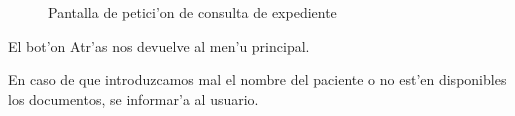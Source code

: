 \begin{enumerate}
\begin{itemize}
\begin{figure}[h!]
	\begin{center}
     	\end{center}
    	\caption{Pantalla de petici'on de consulta de expediente}\label{fig:menu_consulta}
\end{figure}

El bot'on Atr'as nos devuelve al men'u principal.

En caso de que introduzcamos mal el nombre del paciente o no est'en disponibles los documentos, se informar'a al usuario.


\end{itemize}
\end{enumerate}
